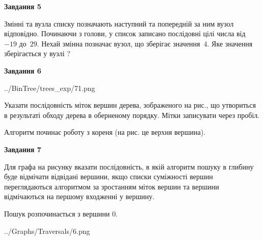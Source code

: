 \documentclass[12pt, ukrainian]{article}
\begin{document}
{\begin {large}
{\begin {center}\textbf{Завдання 5}\end {center}}\par
Змінні  та  вузла списку позначають наступний та попередній за ним вузол відповідно. Починаючи з голови, у список записано послідовні цілі числа від~$-19$ до~$29$. Нехай змінна  позначає вузол, що зберігає значення~$4$.
Яке значення зберігається у вузлі  ?\par
\newpage

{\begin {center}\textbf{Завдання 6}\end {center}}\par

\begin{center}
	{../BinTree/trees_exp/71.png}
\end{center}
Указати послідовність міток вершин дерева, зображеного на рис., що утвориться в результаті обходу дерева в оберненому порядку. Мітки записувати через пробіл.\par Алгоритм починає роботу з кореня (на рис. це верхня вершина).\par
\newpage

{\begin {center}\textbf{Завдання 7}\end {center}}\par
Для графа на рисунку вказати послідовність, в якій алгоритм пошуку в глибину буде відмічати відвідані вершини, якщо списки суміжності вершин переглядаються алгоритмом за зростанням міток вершин та вершини відмічаються на першому вход\-женні у вершину.\par
Пошук розпочинається з вершини 0.\par

\begin{center}
	{../Graphs/Traversals/6.png}
\end{center}\par
\newpage


\end{large}}
\end{document}
